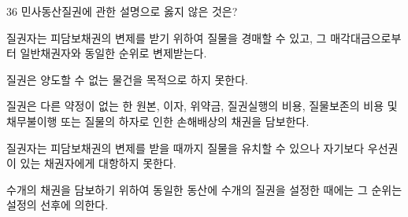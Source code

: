 \begin{question}{36}
민사동산질권에 관한 설명으로 옳지 않은 것은?
\begin{choices}
  \item 질권자는 피담보채권의 변제를 받기 위하여 질물을 경매할 수 있고, 그 매각대금으로부터 일반채권자와 동일한 순위로 변제받는다.
  \item 질권은 양도할 수 없는 물건을 목적으로 하지 못한다.
  \item 질권은 다른 약정이 없는 한 원본, 이자, 위약금, 질권실행의 비용, 질물보존의 비용 및 채무불이행 또는 질물의 하자로 인한 손해배상의 채권을 담보한다.
  \item 질권자는 피담보채권의 변제를 받을 때까지 질물을 유치할 수 있으나 자기보다 우선권이 있는 채권자에게 대항하지 못한다.
  \item 수개의 채권을 담보하기 위하여 동일한 동산에 수개의 질권을 설정한 때에는 그 순위는 설정의 선후에 의한다.
\end{choices}
\end{question}
